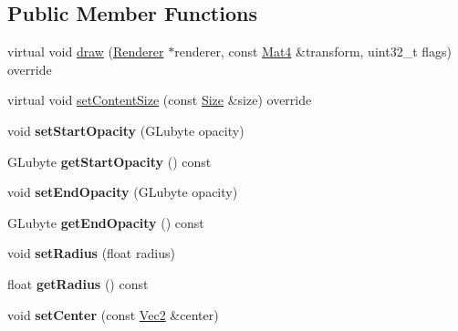 \subsection*{Public Member Functions}
\begin{DoxyCompactItemize}
\item 
virtual void \hyperlink{classLayerRadialGradient_a1756578e18b302c8e2f806646ed8f593}{draw} (\hyperlink{classRenderer}{Renderer} $\ast$renderer, const \hyperlink{classMat4}{Mat4} \&transform, uint32\+\_\+t flags) override
\item 
virtual void \hyperlink{classLayerRadialGradient_ad8edf7d6ace4a1cf07966fd63c942c4b}{set\+Content\+Size} (const \hyperlink{classSize}{Size} \&size) override
\item 
\mbox{\label{classLayerRadialGradient_a97b7cc52c2dc13075e89af182e0a0bc0}} 
void {\bfseries set\+Start\+Opacity} (G\+Lubyte opacity)
\item 
\mbox{\label{classLayerRadialGradient_aabea715543cd4131e87f89a28054eb19}} 
G\+Lubyte {\bfseries get\+Start\+Opacity} () const
\item 
\mbox{\label{classLayerRadialGradient_a56c0342616d07451c71c10b864c8635d}} 
void {\bfseries set\+End\+Opacity} (G\+Lubyte opacity)
\item 
\mbox{\label{classLayerRadialGradient_a729fb49ba238a8951432a37fbae44dcc}} 
G\+Lubyte {\bfseries get\+End\+Opacity} () const
\item 
\mbox{\label{classLayerRadialGradient_a8322e363c4a51eb7f573a0b01058ca7f}} 
void {\bfseries set\+Radius} (float radius)
\item 
\mbox{\label{classLayerRadialGradient_aec090cef2e36b8baae2de589176d9543}} 
float {\bfseries get\+Radius} () const
\item 
\mbox{\label{classLayerRadialGradient_ab17165a81029654339a84838ad1b3727}} 
void {\bfseries set\+Center} (const \hyperlink{classVec2}{Vec2} \&center)
\item 
\mbox{\label{classLayerRadialGradient_aa05c7f8518d2ffa5bcc02301f45aa6dd}} 

\end{DoxyCompactItemize}
